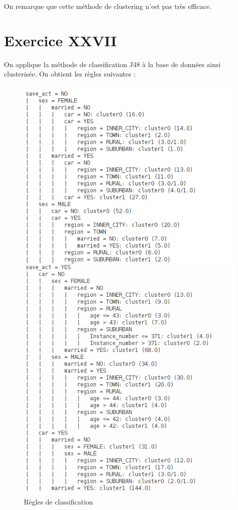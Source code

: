 \documentclass[a4paper, 11pt]{report}
\begin{document}
        On remarque que cette méthode de clustering n'est pas très efficace.
        
        
        \section{Exercice XXVII}
        On applique la méthode de classification J48 à la base de données ainsi clusterisée. On obtient les règles suivantes :
        \begin{figure}[h!]
        \centering
        \includegraphics[scale=0.4]{regles27}
        \caption{Règles de classification}
        \label{fig:exo27}
        \end{figure}

        
        
\end{document}
